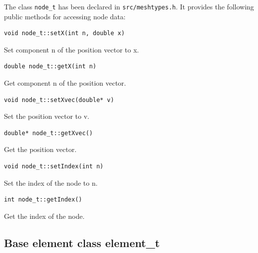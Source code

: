 \documentclass[a4paper,12pt]{article}
\begin{document}
The class {\tt node\_t} has been declared in {\tt src/meshtypes.h}. It provides the
following public methods for accessing node data:
\begin{verbatim}
void node_t::setX(int n, double x)
\end{verbatim}
Set component n of the position vector to x.
\begin{verbatim} 
double node_t::getX(int n)
\end{verbatim}
Get component n of the position vector.
\begin{verbatim} 
void node_t::setXvec(double* v)
\end{verbatim}
Set the position vector to v.
\begin{verbatim} 
double* node_t::getXvec()
\end{verbatim}
Get the position vector.
\begin{verbatim}
void node_t::setIndex(int n)
\end{verbatim}
Set the index of the node to n.
\begin{verbatim} 
int node_t::getIndex()
\end{verbatim}
Get the index of the node.

\subsection{Base element class element\_t}
\end{document}
